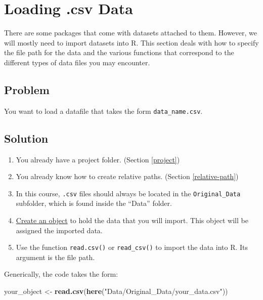 \documentclass[
]{book}
\newenvironment{Shaded}{\begin{snugshade}}{\end{snugshade}}
\newcommand{\FunctionTok}[1]{\textcolor[rgb]{0.13,0.29,0.53}{\textbf{#1}}}
\newcommand{\NormalTok}[1]{#1}
\newcommand{\OtherTok}[1]{\textcolor[rgb]{0.56,0.35,0.01}{#1}}
\newcommand{\StringTok}[1]{\textcolor[rgb]{0.31,0.60,0.02}{#1}}
\providecommand{\tightlist}{%
  \setlength{\itemsep}{0pt}\setlength{\parskip}{0pt}}
\begin{document}
\hypertarget{csv-load}{%
\section{Loading .csv Data}\label{csv-load}}

There are some packages that come with datasets attached to them. However, we will mostly need to import datasets into R. This section deals with how to specify the file path for the data and the various functions that correspond to the different types of data files you may encounter.

\hypertarget{problem-9}{%
\subsection{Problem}\label{problem-9}}

You want to load a datafile that takes the form \texttt{data\_name.csv}.

\hypertarget{solution-9}{%
\subsection{Solution}\label{solution-9}}

\begin{enumerate}
\def\labelenumi{\arabic{enumi}.}
\tightlist
\item
  You already have a project folder. (Section \ref{project})
\item
  You already know how to create relative paths. (Section \ref{relative-path})
\item
  In this course, \texttt{.csv} files should always be located in the \texttt{Original\_Data} subfolder, which is found inside the ``Data'' folder.
\item
  \protect\hyperlink{object}{Create an object} to hold the data that you will import. This object will be assigned the imported data.
\item
  Use the function \texttt{read.csv()} or \texttt{read\_csv()} to import the data into R. Its argument is the file path.
\end{enumerate}

Generically, the code takes the form:

\begin{Shaded}
\begin{Highlighting}[]
\NormalTok{your\_object }\OtherTok{\textless{}{-}} \FunctionTok{read.csv}\NormalTok{(}\FunctionTok{here}\NormalTok{(}\StringTok{"Data/Original\_Data/your\_data.csv"}\NormalTok{))}
\end{Highlighting}
\end{Shaded}
\end{document}
